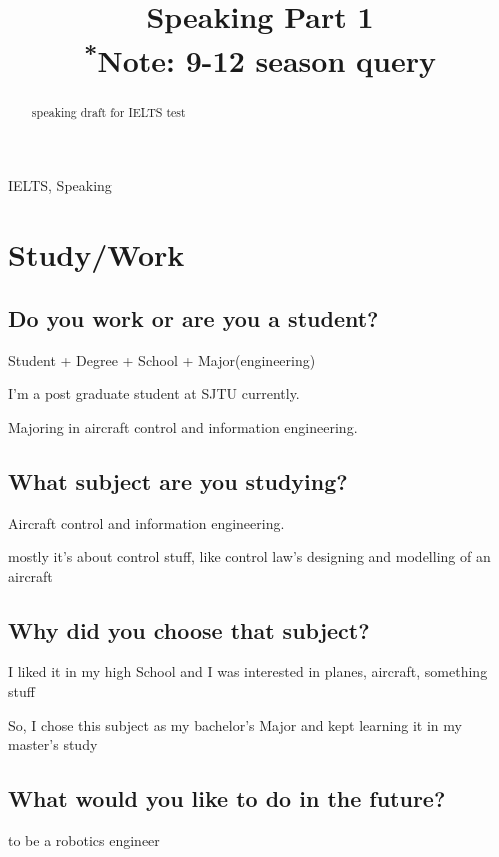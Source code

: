 \documentclass[conference]{IEEEtran}
\begin{document}
\title{Speaking Part 1\\
{\footnotesize \textsuperscript{*}Note:
9-12 season query}
}

\author{
}

\maketitle

\begin{abstract}
speaking draft for IELTS test
\end{abstract}

\begin{IEEEkeywords}
IELTS, Speaking
\end{IEEEkeywords}


\section{Study/Work}

\subsection{Do you work or are you a student?}
Student + Degree + School + Major(engineering)

I'm a post graduate student at SJTU currently.

Majoring in aircraft control and information engineering. 


\subsection{What subject are you studying?}
Aircraft control and information engineering.

mostly it's about control stuff, like control law's designing and modelling of an aircraft

\subsection{Why did you choose that subject?}
I liked it in my high School and I was interested in planes, aircraft, something stuff

So, I chose this subject as my bachelor's Major and kept learning it in my master's study



\subsection{What would you like to do in the future?}
to be a robotics engineer
\end{document}
